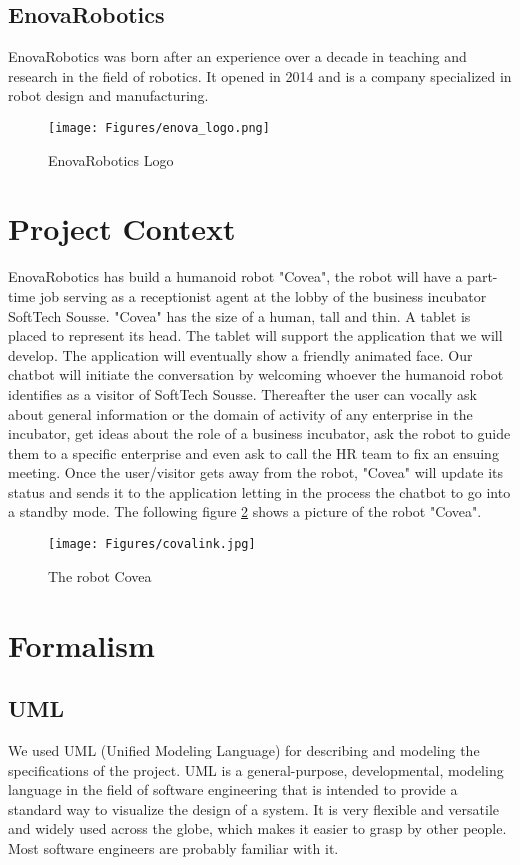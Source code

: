 \subsection{EnovaRobotics}
EnovaRobotics was born after an experience over a decade in teaching and research in the field of robotics. It opened in 2014 and is a company specialized in robot design and manufacturing.
\begin{figure}[H]
\centering
\texttt{[image: Figures/enova\_logo.png]}
\decoRule
\caption{EnovaRobotics Logo}
\label{fig:EnovaRobotics Logo}
\end{figure}


\section{Project Context}
EnovaRobotics has build a humanoid robot "Covea", the robot will have a part-time job serving as a receptionist agent at the lobby of the business incubator SoftTech Sousse. "Covea" has the size of a human, tall and thin. A tablet is placed to represent its head. The tablet will support the application that we will develop. The application will eventually show a friendly animated face. Our chatbot will initiate the conversation by welcoming whoever the humanoid robot identifies as a visitor of SoftTech Sousse. Thereafter the user can vocally ask about general information or the domain of activity of any enterprise in the incubator, get ideas about the role of a business incubator, ask the robot to guide them to a specific enterprise and even ask to call the HR team to fix an ensuing meeting. Once the user/visitor gets away from the robot, "Covea" will update its status and sends it to the application letting in the process the chatbot to go into a standby mode. The following figure \ref{fig:Covea} shows a picture of the robot "Covea".
\begin{figure}[H]
\centering
\texttt{[image: Figures/covalink.jpg]}
\decoRule
\caption{The robot Covea}
\label{fig:Covea}
\end{figure}
\section{Formalism}
\subsection{UML}
We used UML (Unified Modeling Language) for describing and modeling the specifications of the project. UML is a general-purpose, developmental, modeling language in the field of software engineering that is intended to provide a standard way to visualize the design of a system. It is very flexible and versatile and widely used across the globe, which makes it easier to grasp by other people. Most software engineers are probably familiar with it.

